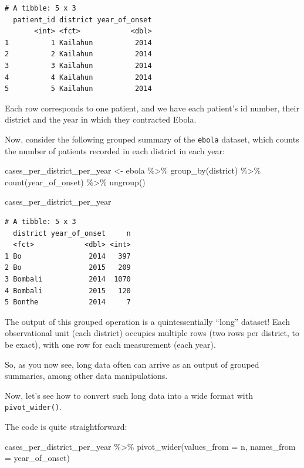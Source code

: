 \documentclass[
  letterpaper,
  DIV=11,
  numbers=noendperiod]{scrreprt}
\newenvironment{Shaded}{\begin{snugshade}}{\end{snugshade}}
\newcommand{\AttributeTok}[1]{\textcolor[rgb]{0.40,0.45,0.13}{#1}}
\newcommand{\FunctionTok}[1]{\textcolor[rgb]{0.28,0.35,0.67}{#1}}
\newcommand{\NormalTok}[1]{\textcolor[rgb]{0.00,0.23,0.31}{#1}}
\newcommand{\OtherTok}[1]{\textcolor[rgb]{0.00,0.23,0.31}{#1}}
\newcommand{\SpecialCharTok}[1]{\textcolor[rgb]{0.37,0.37,0.37}{#1}}
\begin{document}
\begin{verbatim}
# A tibble: 5 x 3
  patient_id district year_of_onset
       <int> <fct>            <dbl>
1          1 Kailahun          2014
2          2 Kailahun          2014
3          3 Kailahun          2014
4          4 Kailahun          2014
5          5 Kailahun          2014
\end{verbatim}

Each row corresponds to one patient, and we have each patient's id
number, their district and the year in which they contracted Ebola.

Now, consider the following grouped summary of the \texttt{ebola}
dataset, which counts the number of patients recorded in each district
in each year:

\begin{Shaded}
\begin{Highlighting}[]
\NormalTok{cases\_per\_district\_per\_year }\OtherTok{\textless{}{-}} 
\NormalTok{  ebola }\SpecialCharTok{\%\textgreater{}\%} 
  \FunctionTok{group\_by}\NormalTok{(district) }\SpecialCharTok{\%\textgreater{}\%} 
  \FunctionTok{count}\NormalTok{(year\_of\_onset) }\SpecialCharTok{\%\textgreater{}\%} 
  \FunctionTok{ungroup}\NormalTok{()}

\NormalTok{cases\_per\_district\_per\_year}
\end{Highlighting}
\end{Shaded}

\begin{verbatim}
# A tibble: 5 x 3
  district year_of_onset     n
  <fct>            <dbl> <int>
1 Bo                2014   397
2 Bo                2015   209
3 Bombali           2014  1070
4 Bombali           2015   120
5 Bonthe            2014     7
\end{verbatim}

The output of this grouped operation is a quintessentially ``long''
dataset! Each observational unit (each district) occupies multiple rows
(two rows per district, to be exact), with one row for each measurement
(each year).

So, as you now see, long data often can arrive as an output of grouped
summaries, among other data manipulations.

Now, let's see how to convert such long data into a wide format with
\texttt{pivot\_wider()}.

The code is quite straightforward:

\begin{Shaded}
\begin{Highlighting}[]
\NormalTok{cases\_per\_district\_per\_year }\SpecialCharTok{\%\textgreater{}\%} 
  \FunctionTok{pivot\_wider}\NormalTok{(}\AttributeTok{values\_from =}\NormalTok{ n, }
              \AttributeTok{names\_from =}\NormalTok{ year\_of\_onset)}
\end{Highlighting}
\end{Shaded}
\end{document}
